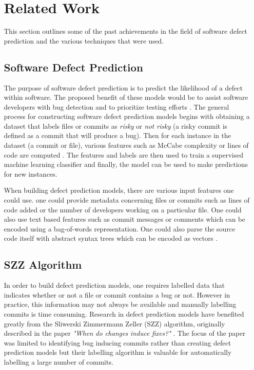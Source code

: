 \documentclass[../main.tex]{subfiles}
\begin{document}
\section{Related Work}

This section outlines some of the past achievements in the field of software defect prediction and the various techniques that were used. 

\subsection{Software Defect Prediction}

The purpose of software defect prediction is to predict the likelihood of a defect within software. The proposed benefit of these models would be to assist software developers with bug detection and to prioritize testing efforts \cite{briski2008minimizing}. The general process for constructing software defect prediction models begins with obtaining a dataset that labels files or commits as \emph{risky} or \emph{not risky} (a risky commit is defined as a commit that will produce a bug). Then for each instance in the dataset (a commit or file), various features such as McCabe complexity or lines of code are computed \cite{zhang2007predicting}. The features and labels are then used to train a supervised machine learning classifier and finally, the model can be used to make predictions for new instances. 

When building defect prediction models, there are various input features one could use. one could provide metadata concerning files or commits such as lines of code added or the number of developers working on a particular file. One could also use text based features such as commit messages or comments which can be encoded using a bag-of-words representation. One could also parse the source code itself with abstract syntax trees which can be encoded as vectors \cite{tan2015online}.


\subsection{SZZ Algorithm}

In order to build defect prediction models, one requires labelled data that indicates whether or not a file or commit contains a bug or not. However in practice, this information may not always be available and manually labelling commits is time consuming. Research in defect prediction models have benefited greatly from the Sliwerski Zimmermann Zeller (SZZ) algorithm, originally described in the paper \textit{"When do changes induce fixes?"} \cite{sliwerski2005changes}. The focus of the paper was limited to identifying bug inducing commits rather than creating defect prediction models but their labelling algorithm is valuable for automatically labelling a large number of commits. 
\end{document}
